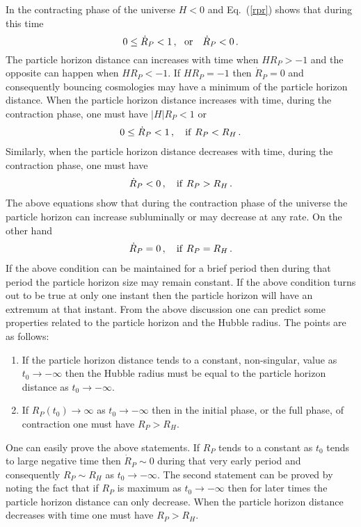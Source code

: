 \documentclass[24pt]{article}
\begin{document}
In the contracting phase of the universe $H<0$ and Eq.~(\ref{rpr})
shows that during this time
$$0 \le \dot{R}_P < 1\,,\,\,\,\,{\rm or}\,\,\,\,\,\,\dot{R}_P<0\,.$$ The
particle horizon distance can increases with time when $H R_P > -1$
and the opposite can happen when $H R_P < -1$. If $HR_P=-1$ then
$\dot{R}_P=0$ and consequently bouncing cosmologies may have a minimum
of the particle horizon distance. When the particle horizon distance
increases with time, during the contraction phase, one must have $|H|
R_P < 1$ or
\begin{eqnarray}
0 \le \dot{R}_P < 1\,,\,\,\,\,\,\,{\rm if}\,\,R_P < R_H\,.
\label{rpin}  
\end{eqnarray}
Similarly, when the particle horizon distance decreases with time,
during the contraction phase, one must have
\begin{eqnarray}
\dot{R}_P <0\,,\,\,\,\,\,\,{\rm if}\,\,R_P > R_H\,.
\label{rpde}  
\end{eqnarray}
The above equations show that during the contraction phase of the
universe the particle horizon can increase subluminally or may
decrease at any rate. On the other hand
\begin{eqnarray}
\dot{R}_P = 0\,,\,\,\,\,\,\,{\rm if}\,\,R_P = R_H\,.
\label{rpc}  
\end{eqnarray}
If the above condition can be maintained for a brief period then
during that period the particle horizon size may remain constant. If
the above condition turns out to be true at only one instant then the
particle horizon will have an extremum at that instant.  From the
above discussion one can predict some properties related to the
particle horizon and the Hubble radius. The points are as follows:
\begin{enumerate}
\item If the particle horizon distance tends to a constant,
  non-singular, value as $t_0 \to -\infty$ then the Hubble radius must
  be equal to the particle horizon distance as $t_0 \to -\infty$.

\item If $R_P(t_0) \to \infty$ as $t_0 \to -\infty$ then in the
  initial phase, or the full phase, of contraction one must have $R_P > R_H$.
\end{enumerate}
One can easily prove the above statements. If $R_P$ tends to a
constant as $t_0$ tends to large negative time then $\dot{R}_P \sim 0$
during that very early period and consequently $R_P \sim R_H$ as $t_0
\to -\infty$. The second statement can be proved by noting the fact
that if $R_P$ is maximum as $t_0 \to -\infty$ then for later times the
particle horizon distance can only decrease. When the particle horizon
distance decreases with time one must have $R_P > R_H$.
 
\end{document}
